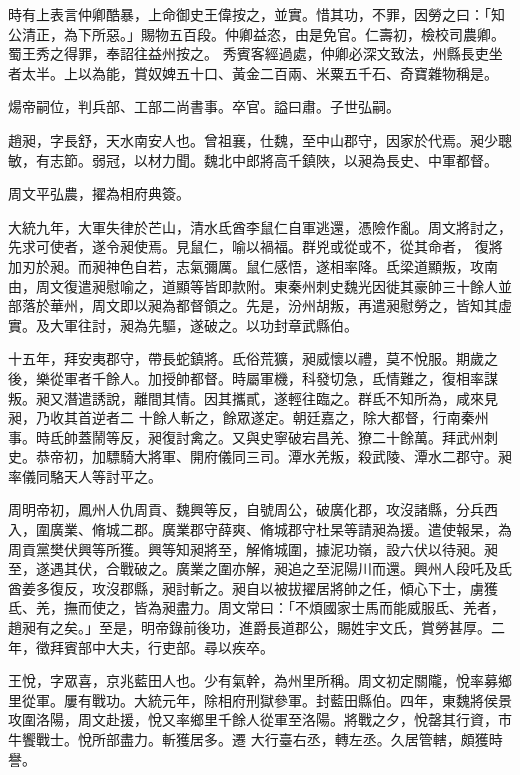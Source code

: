 \begin{pinyinscope}
 時有上表言仲卿酷暴，上命御史王偉按之，並實。惜其功，不罪，因勞之曰：「知公清正，為下所惡。」賜物五百段。仲卿益恣，由是免官。仁壽初，檢校司農卿。蜀王秀之得罪，奉詔往益州按之。
 秀賓客經過處，仲卿必深文致法，州縣長吏坐者太半。上以為能，賞奴婢五十口、黃金二百兩、米粟五千石、奇寶雜物稱是。



 煬帝嗣位，判兵部、工部二尚書事。卒官。謚曰肅。子世弘嗣。



 趙昶，字長舒，天水南安人也。曾祖襄，仕魏，至中山郡守，因家於代焉。昶少聰敏，有志節。弱冠，以材力聞。魏北中郎將高千鎮陜，以昶為長史、中軍都督。



 周文平弘農，擢為相府典簽。



 大統九年，大軍失律於芒山，清水氐酋李鼠仁自軍逃還，憑險作亂。周文將討之，先求可使者，遂令昶使焉。見鼠仁，喻以禍福。群兇或從或不，從其命者，
 復將加刃於昶。而昶神色自若，志氣彌厲。鼠仁感悟，遂相率降。氐梁道顯叛，攻南由，周文復遣昶慰喻之，道顯等皆即款附。東秦州刺史魏光因徙其豪帥三十餘人並部落於華州，周文即以昶為都督領之。先是，汾州胡叛，再遣昶慰勞之，皆知其虛實。及大軍往討，昶為先驅，遂破之。以功封章武縣伯。



 十五年，拜安夷郡守，帶長蛇鎮將。氐俗荒獷，昶威懷以禮，莫不悅服。期歲之後，樂從軍者千餘人。加授帥都督。時屬軍機，科發切急，氐情難之，復相率謀叛。昶又潛遣誘說，離間其情。因其攜貳，遂輕往臨之。群氐不知所為，咸來見昶，乃收其首逆者二
 十餘人斬之，餘眾遂定。朝廷嘉之，除大都督，行南秦州事。時氐帥蓋鬧等反，昶復討禽之。又與史寧破宕昌羌、獠二十餘萬。拜武州刺史。恭帝初，加驃騎大將軍、開府儀同三司。潭水羌叛，殺武陵、潭水二郡守。昶率儀同駱天人等討平之。



 周明帝初，鳳州人仇周貢、魏興等反，自號周公，破廣化郡，攻沒諸縣，分兵西入，圍廣業、脩城二郡。廣業郡守薛爽、脩城郡守杜杲等請昶為援。遣使報杲，為周貢黨樊伏興等所獲。興等知昶將至，解脩城圍，據泥功嶺，設六伏以待昶。昶至，遂遇其伏，合戰破之。廣業之圍亦解，昶追之至泥陽川而還。興州人段吒及氐
 酋姜多復反，攻沒郡縣，昶討斬之。昶自以被拔擢居將帥之任，傾心下士，虜獲氐、羌，撫而使之，皆為昶盡力。周文常曰：「不煩國家士馬而能威服氐、羌者，趙昶有之矣。」至是，明帝錄前後功，進爵長道郡公，賜姓宇文氏，賞勞甚厚。二年，徵拜賓部中大夫，行吏部。尋以疾卒。



 王悅，字眾喜，京兆藍田人也。少有氣幹，為州里所稱。周文初定關隴，悅率募鄉里從軍。屢有戰功。大統元年，除相府刑獄參軍。封藍田縣伯。四年，東魏將侯景攻圍洛陽，周文赴援，悅又率鄉里千餘人從軍至洛陽。將戰之夕，悅罄其行資，市牛饗戰士。悅所部盡力。斬獲居多。遷
 大行臺右丞，轉左丞。久居管轄，頗獲時譽。




\end{pinyinscope}
